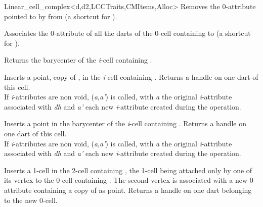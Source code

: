 \begin{ccRefClass}{Linear_cell_complex<d,d2,LCCTraits,CMItems,Alloc>}
{Removes the 0-attribute pointed to by  from 
  (a shortcut for ).
}

{Associates the 0-attribute of all the darts of the 0-cell 
  containing  to 
  (a shortcut for ).
}


{Returns the barycenter of the \emph{i}-cell containing .
}

{Inserts a point, copy of , in the \emph{i}-cell containing .
  Returns a handle on one dart of this cell.  
  \\
    If \emph{i}-attributes are non void, 
    (\emph{a},\emph{a'}) is called, 
    with \emph{a} the original \emph{i}-attribute associated
    with \emph{dh} and \emph{a'} each new \emph{i}-attribute created during the operation.
}

{Inserts a point in the barycenter of the \emph{i}-cell containing .
  Returns a handle on one dart of this cell.  
  \\
    If \emph{i}-attributes are non void, 
    (\emph{a},\emph{a'}) is called,
    with \emph{a} the original \emph{i}-attribute associated
    with \emph{dh} and \emph{a'} each new \emph{i}-attribute created during the operation.
}

{Inserts a 1-cell in the 2-cell containing , the 1-cell
  being attached only by one of its vertex to the 0-cell containing .
  The second vertex is associated with a new 0-attribute containing a copy of
   as point. Returns a handle on one dart belonging to the new 0-cell.
}


\end{ccRefClass}
